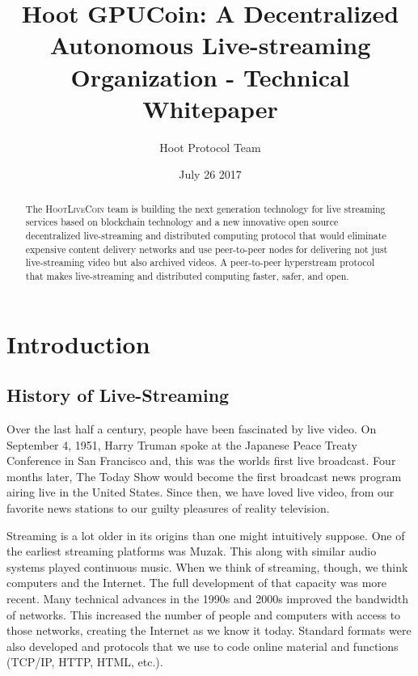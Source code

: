 \documentclass{article}
\title{Hoot GPUCoin: A Decentralized Autonomous Live-streaming Organization - Technical Whitepaper}
\author{Hoot Protocol Team}
\date{July 26 2017}
\begin{document}
\maketitle

\begin{abstract}
The \textsc{HootLiveCoin} team is building the next generation technology for live streaming services based on blockchain technology and a new innovative open source decentralized live-streaming and distributed computing protocol that would eliminate expensive content delivery networks and use peer-to-peer nodes for delivering not just live-streaming video but also archived videos. A peer-to-peer hyperstream protocol that makes live-streaming and distributed computing faster, safer, and open.

\end{abstract}
\newpage

\tableofcontents
\newpage

\section{Introduction}
\subsection{History of Live-Streaming}
Over the last half a century, people have been fascinated by live video. On September 4, 1951, Harry Truman spoke at the Japanese Peace Treaty Conference in San Francisco and, this was the worlds first live broadcast. Four months later, The Today Show would become the first broadcast news program airing live in the United States. Since then, we have loved live video, from our favorite news stations to our guilty pleasures of reality television.

Streaming is a lot older in its origins than one might intuitively suppose. One of the earliest streaming platforms was Muzak. This along with similar audio systems played continuous music. When we think of streaming, though, we think computers and the Internet. The full development of that capacity was more recent. Many technical advances in the 1990s and 2000s improved the bandwidth of networks. This increased the number of people and computers with access to those networks, creating the Internet as we know it today. Standard formats were also developed and protocols that we use to code online material and functions (TCP/IP, HTTP, HTML, etc.).
\end{document}
